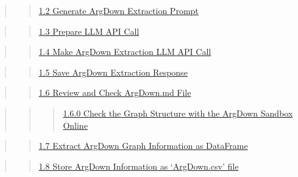 \documentclass[
  11pt,
  letterpaper,
]{book}
\begin{document}
\begin{quote}
\begin{quote}
\hyperref[scrollTo=6ToQFra3_nl9ux26uniqifier=1]{1.2 Generate ArgDown
Extraction Prompt}
\end{quote}
\end{quote}

\begin{quote}
\begin{quote}
\hyperref[scrollTo=pGv2KcZU_9Bnux26uniqifier=1]{1.3 Prepare LLM API
Call}
\end{quote}
\end{quote}

\begin{quote}
\begin{quote}
\hyperref[scrollTo=i5xsDYnsAWC4ux26uniqifier=1]{1.4 Make ArgDown
Extraction LLM API Call}
\end{quote}
\end{quote}

\begin{quote}
\begin{quote}
\hyperref[scrollTo=Lc2nMp8nAfeUux26uniqifier=1]{1.5 Save ArgDown
Extraction Response}
\end{quote}
\end{quote}

\begin{quote}
\begin{quote}
\hyperref[scrollTo=5HcCfqE4A0htux26uniqifier=1]{1.6 Review and Check
ArgDown.md File}
\end{quote}
\end{quote}

\begin{quote}
\begin{quote}
\begin{quote}
\hyperref[scrollTo=gSpkvLbCC_PIux26uniqifier=1]{1.6.0 Check the Graph
Structure with the ArgDown Sandbox Online}
\end{quote}
\end{quote}
\end{quote}

\begin{quote}
\begin{quote}
\hyperref[scrollTo=MAm0UKpeBvyrux26uniqifier=1]{1.7 Extract ArgDown
Graph Information as DataFrame}
\end{quote}
\end{quote}

\begin{quote}
\begin{quote}
\hyperref[scrollTo=iFC6oiyICREnux26uniqifier=1]{1.8 Store ArgDown
Information as `ArgDown.csv' file}
\end{quote}
\end{quote}
\end{document}
